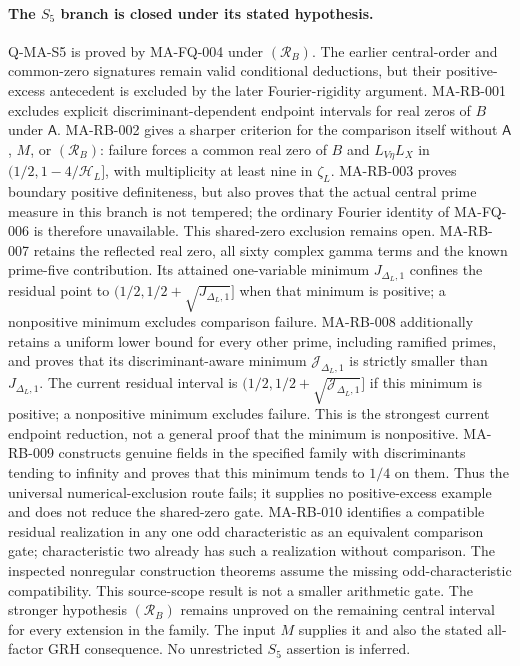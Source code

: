 \documentclass[11pt,a4paper]{article}
\begin{document}
\paragraph{The $S_5$ branch is closed under its stated hypothesis.}
Q-MA-S5 is proved by MA-FQ-004 under $(\mathcal R_B)$.
The earlier central-order and common-zero signatures remain
valid conditional deductions, but their positive-excess
antecedent is excluded by the later Fourier-rigidity argument.
MA-RB-001 excludes explicit discriminant-dependent endpoint
intervals for real zeros of $B$ under $\mathsf A$.
MA-RB-002 gives a sharper criterion for the comparison itself
without $\mathsf A$, $M$, or $(\mathcal R_B)$: failure forces a
common real zero of $B$ and $L_{V\eta}L_X$ in
$(1/2,1-4/\mathcal H_L]$, with multiplicity at least nine in
$\zeta_L$. MA-RB-003 proves boundary positive definiteness, but
also proves that the actual central prime measure in this branch
is not tempered; the ordinary Fourier identity of MA-FQ-006 is
therefore unavailable. This shared-zero exclusion remains open.
MA-RB-007 retains the reflected real zero, all sixty complex
gamma terms and the known prime-five contribution. Its attained
one-variable minimum $J_{\Delta_L,1}$ confines the residual
point to $(1/2,1/2+\sqrt{J_{\Delta_L,1}}]$ when that minimum
is positive; a nonpositive minimum excludes comparison failure.
MA-RB-008 additionally retains a uniform lower bound for every
other prime, including ramified primes, and proves that its
discriminant-aware minimum $\mathcal J_{\Delta_L,1}$ is strictly
smaller than $J_{\Delta_L,1}$. The current residual interval is
$(1/2,1/2+\sqrt{\mathcal J_{\Delta_L,1}}]$ if this minimum is
positive; a nonpositive minimum excludes failure. This is the
strongest current endpoint reduction, not a general proof that
the minimum is nonpositive. MA-RB-009 constructs genuine fields
in the specified family with discriminants tending to infinity
and proves that this minimum tends to $1/4$ on them. Thus the
universal numerical-exclusion route fails; it supplies no
positive-excess example and does not reduce the shared-zero gate.
MA-RB-010 identifies a compatible residual realization in
any one odd characteristic as an equivalent comparison gate;
characteristic two already has such a realization without
comparison. The inspected nonregular construction theorems
assume the missing odd-characteristic compatibility. This
source-scope result is not a smaller arithmetic gate.
The stronger hypothesis $(\mathcal R_B)$ remains unproved on
the remaining central interval for every extension in the family.
The input $M$ supplies it and also the stated all-factor GRH
consequence. No unrestricted $S_5$ assertion is inferred.
\end{document}
